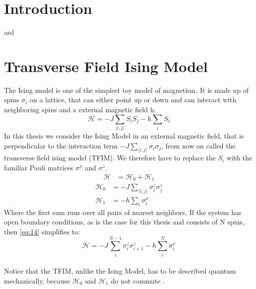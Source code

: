 \documentclass{article}
\begin{document}
\tableofcontents



\section{Introduction}
asd
\section{Transverse Field Ising Model}
The Ising model is one of the simplest toy model of magnetism. It is
made up of spins $\sigma_i$ on a lattice, that can either point up or
down and can interact with neighboring spins and a external magnetic
field h.
\begin{equation}
\label{eq:18}
\mathcal{H} = -J \sum\limits_{\langle i,j \rangle} S_i S_j- h
\sum\limits_i S_i
\end{equation}
In this thesis we consider the Ising Model in an external magnetic
field, that is perpendicular to the interaction term $-J \sum_{\langle
i,j \rangle} \sigma_i \sigma_j$, from now on called the transverse
field ising model (TFIM). We therefore have to replace the $S_i$ with
the familiar Pauli matrices $\sigma^x$ and $\sigma^z$.
\begin{align}
\label{eq:14}
\mathcal{H} &= \mathcal{H}_0 + \mathcal{H}_1
\end{align}
\begin{align}
\label{eq:24}
\mathcal{H}_0 &= -J \sum\limits_{\langle i,j \rangle} \sigma_i^z \sigma_j ^z\\
\mathcal{H}_1 &= - h \sum\limits_i \sigma_i^x
\end{align}
Where the first sum runs over all pairs of nearest neighbors. If the
system has open boundary conditions, as is the case for this thesis and consists of N spins, then
\eqref{eq:14} simplifies to:
\begin{equation}
\label{eq:19}
\mathcal{H} = -J \sum\limits_i^{N-1} \sigma_i^z \sigma_{i+1} ^z- h
\sum\limits_i^N \sigma_i^x
\end{equation}
\\
Notice that the TFIM, unlike the Ising Model, has to be described
quantum mechanically, because $\mathcal{H}_0$ and $\mathcal{H}_1$ do
not commute .\\
\end{document}

